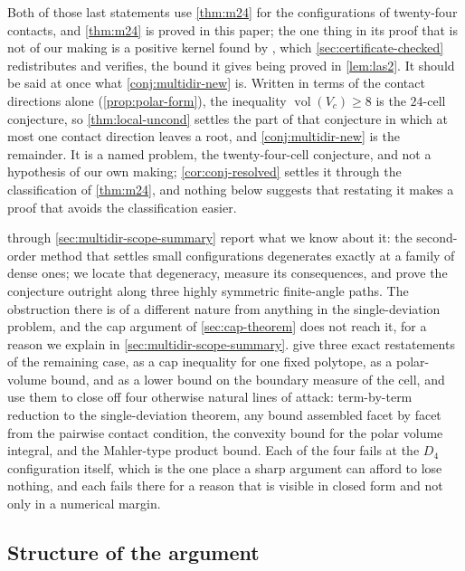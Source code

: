 \documentclass[11pt,reqno]{amsart}
\renewcommand{\_}{\origunderscore\allowbreak}
\numberwithin{equation}{section}
\theoremstyle{plain}
\theoremstyle{definition}
\theoremstyle{remark}
\DeclareMathOperator{\vol}{vol}
\begin{document}
Both of those last statements use \cref{thm:m24} for the configurations
of twenty-four contacts, and \cref{thm:m24} is proved in this paper; the
one thing in its proof that is not of our making is a positive kernel
found by \cite{LLM24}, which \cref{sec:certificate-checked} redistributes
and verifies, the bound it gives being proved in \cref{lem:las2}.
It should be said at once what \cref{conj:multidir-new} is. Written in
terms of the contact directions alone (\cref{prop:polar-form}), the
inequality $\vol(V_c)\ge8$ is the $24$-cell conjecture, so
\cref{thm:local-uncond} settles the part of that conjecture in which at
most one contact direction leaves a root, and \cref{conj:multidir-new}
is the remainder. It is a named problem, the twenty-four-cell
conjecture, and not a hypothesis of our own making;
\cref{cor:conj-resolved} settles it through the classification of
\cref{thm:m24}, and nothing below suggests that restating it makes a
proof that avoids the classification easier.

 through \cref{sec:multidir-scope-summary}
report what we know about it: the second-order
method that settles small configurations degenerates exactly at a
family of dense ones; we locate that degeneracy, measure its
consequences, and prove the conjecture outright along three highly
symmetric finite-angle paths. The obstruction there is of a different
nature from anything in the single-deviation problem, and the cap
argument of \cref{sec:cap-theorem} does not reach it, for a reason we
explain in \cref{sec:multidir-scope-summary}.
 give three exact restatements of
the remaining case, as a cap inequality for one fixed polytope, as a
polar-volume bound, and as a lower bound on the boundary measure of the
cell, and use them to close off four otherwise natural lines of attack:
term-by-term reduction to the single-deviation theorem, any bound
assembled facet by facet from the pairwise contact condition, the
convexity bound for the polar volume integral, and the Mahler-type
product bound. Each of the four fails at the $D_4$ configuration itself,
which is the one place a sharp argument can afford to lose nothing, and
each fails there for a reason that is visible in closed form and not only in a numerical margin.

\subsection{Structure of the argument}\label{sec:argument-structure}
\end{document}
